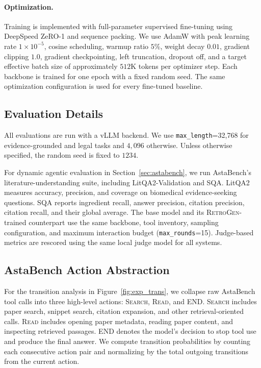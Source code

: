 \paragraph{Optimization.}
Training is implemented with full-parameter supervised fine-tuning
using DeepSpeed ZeRO-1 and sequence packing. We use AdamW with peak
learning rate $1\times10^{-5}$, cosine scheduling, warmup ratio $5\%$,
weight decay $0.01$, gradient clipping $1.0$, gradient checkpointing,
left truncation, dropout off, and a target effective batch size of
approximately $512$K tokens per optimizer step. Each backbone is
trained for one epoch with a fixed random seed. The same optimization
configuration is used for every fine-tuned baseline.

\subsection{Evaluation Details}
\label{app:eval}

All evaluations are run with a vLLM backend.
We use \texttt{max\_length}=32{,}768 for evidence-grounded and legal
tasks and $4{,}096$ otherwise. Unless otherwise specified, the random
seed is fixed to $1234$. 

For dynamic agentic evaluation in Section~\ref{sec:astabench}, we run
AstaBench's literature-understanding suite, including
LitQA2-Validation and SQA. LitQA2 measures accuracy, precision, and
coverage on biomedical evidence-seeking questions. SQA reports
ingredient recall, answer precision, citation precision, citation
recall, and their global average. The base model and its
\textsc{RetroGen}-trained counterpart use the same backbone, tool
inventory, sampling configuration, and maximum interaction budget
(\texttt{max\_rounds}=15). Judge-based metrics are rescored using the
same local judge model for all systems.

\subsection{AstaBench Action Abstraction}
\label{app:astabench_actions}

For the transition analysis in Figure~\ref{fig:exp_trans}, we collapse
raw AstaBench tool calls into three high-level actions:
\textsc{Search}, \textsc{Read}, and \textsc{END}. \textsc{Search}
includes paper search, snippet search, citation expansion, and other
retrieval-oriented calls. \textsc{Read} includes opening paper
metadata, reading paper content, and inspecting retrieved passages.
\textsc{END} denotes the model's decision to stop tool use and produce
the final answer. We compute transition probabilities by counting each
consecutive action pair and normalizing by the total outgoing
transitions from the current action.

